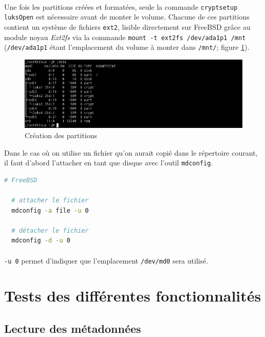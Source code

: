 \paragraph{}
Une fois les partitions créées et formatées, seule la commande
\texttt{cryptsetup luksOpen} est nécessaire avant de monter le volume. Chacune
de ces partitions contient un système de fichiers \texttt{ext2}, lisible
directement sur FreeBSD grâce au module noyau \textit{Ext2fs} via la commande
\texttt{mount -t ext2fs /dev/ada1p1 /mnt} (\texttt{/dev/ada1p1} étant
l'emplacement du volume à monter dans \texttt{/mnt/}; figure
\ref{fig:linux_partitions}).
\begin{figure}[H]
  \centering
  \includegraphics[width=\linewidth]{tests/linux_partitions.png}
  \caption{\label{fig:linux_partitions}Création des partitions}
\end{figure}
Dans le cas où on utilise un fichier qu'on aurait copié dans le répertoire
courant, il faut d'abord l'attacher en tant que disque avec l'outil
\texttt{mdconfig}.
\\
\begin{lstlisting}[language=bash]
  # FreeBSD
  
  # attacher le fichier
  mdconfig -a file -u 0

  # détacher le fichier
  mdconfig -d -u 0
\end{lstlisting}
\paragraph{}
\texttt{-u 0} permet d'indiquer que l'emplacement \texttt{/dev/md0} sera
utilisé.

\section{Tests des différentes fonctionnalités}

\subsection{Lecture des métadonnées}
